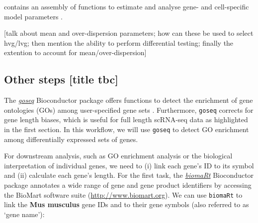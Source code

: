 \documentclass[9pt,a4paper,]{extarticle}
\begin{document}
contains an assembly of
functions to estimate and analyse gene- and cell-specific model parameters
\citep{Vallejos2015BASiCS, Vallejos2016, Eling2018}.

{[}talk about mean and over-dispersion parameters; how can these be used to select hvg/lvg;
then mention the ability to perform differential testing;
finally the extention to account for mean/over-dispersion{]}

\hypertarget{other-steps-title-tbc}{%
\subsection{Other steps {[}title tbc{]}}\label{other-steps-title-tbc}}

The \emph{\href{https://bioconductor.org/packages/3.11/goseq}{goseq}} Bioconductor package offers functions to detect the
enrichment of gene ontologies (GOs) among user-specified gene sets \citep{Young2010}.
Furthermore, \texttt{goseq} corrects for gene length biases, which is useful for full
length scRNA-seq data as highlighted in the first section.
In this workflow, we will use \texttt{goseq} to detect GO enrichment among
differentially expressed sets of genes.

For downstream analysis, such as GO enrichment analysis or the biological
interpretation of individual genes, we need to (i) link each gene's ID to its
symbol and (ii) calculate each gene's length.
For the first task, the \emph{\href{https://bioconductor.org/packages/3.11/biomaRt}{biomaRt}} Bioconductor package annotates a
wide range of gene and gene product identifiers \citep{Durinck2005} by accessing the
BioMart software suite (\url{http://www.biomart.org}).
We can use \texttt{biomaRt} to link the \textbf{Mus musculus} gene IDs and to their gene
symbols (also referred to as `gene name'):

{\small}
\end{document}

